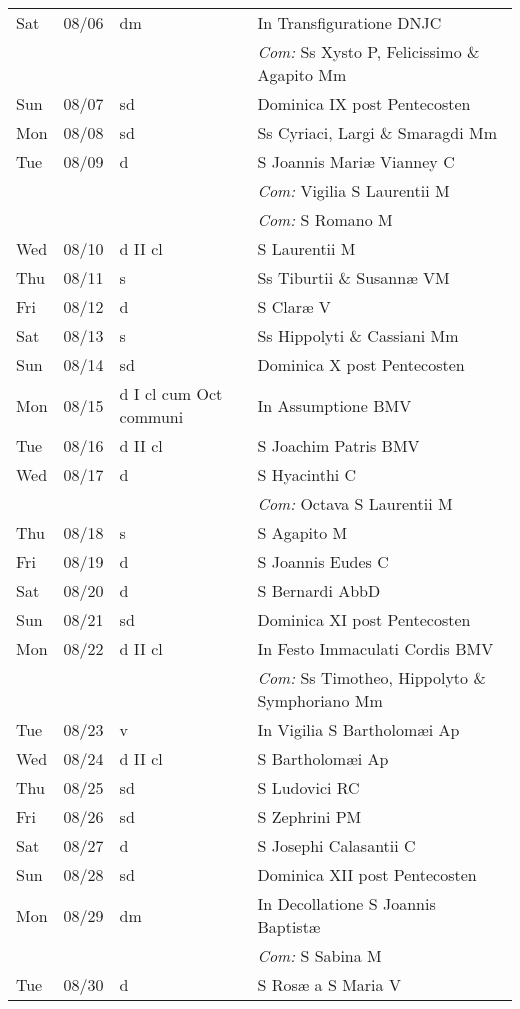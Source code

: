 \documentclass[10pt]{article}
\begin{document}
\begin{longtable}{ l l l l }
Sat & 08/06 & dm & In Transfiguratione DNJC\\
 & & & \textit{Com:} Ss Xysto P, Felicissimo \& Agapito Mm\\
Sun & 08/07 & sd & Dominica IX post Pentecosten\\
Mon & 08/08 & sd & Ss Cyriaci, Largi \& Smaragdi Mm\\
Tue & 08/09 & d & S Joannis Mariæ Vianney C\\
 & & & \textit{Com:} Vigilia S Laurentii M\\
 & & & \textit{Com:} S Romano M\\
Wed & 08/10 & d II cl & S Laurentii M\\
Thu & 08/11 & s & Ss Tiburtii \& Susannæ VM\\
Fri & 08/12 & d & S Claræ V\\
Sat & 08/13 & s & Ss Hippolyti \& Cassiani Mm\\
Sun & 08/14 & sd & Dominica X post Pentecosten\\
Mon & 08/15 & d I cl cum Oct communi & In Assumptione BMV\\
Tue & 08/16 & d II cl & S Joachim Patris BMV\\
Wed & 08/17 & d & S Hyacinthi C\\
 & & & \textit{Com:} Octava S Laurentii M\\
Thu & 08/18 & s & S Agapito M\\
Fri & 08/19 & d & S Joannis Eudes C\\
Sat & 08/20 & d & S Bernardi AbbD\\
Sun & 08/21 & sd & Dominica XI post Pentecosten\\
Mon & 08/22 & d II cl & In Festo Immaculati Cordis BMV\\
 & & & \textit{Com:} Ss Timotheo, Hippolyto \& Symphoriano Mm\\
Tue & 08/23 & v & In Vigilia S Bartholomæi Ap\\
Wed & 08/24 & d II cl & S Bartholomæi Ap\\
Thu & 08/25 & sd & S Ludovici RC\\
Fri & 08/26 & sd & S Zephrini PM\\
Sat & 08/27 & d & S Josephi Calasantii C\\
Sun & 08/28 & sd & Dominica XII post Pentecosten\\
Mon & 08/29 & dm & In Decollatione S Joannis Baptistæ\\
 & & & \textit{Com:} S Sabina M\\
Tue & 08/30 & d & S Rosæ a S Maria V\\

\end{longtable}
\end{document}
